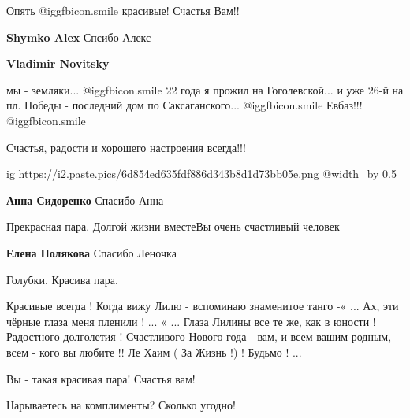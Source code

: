  
 
 
 
 

Опять  @igg{fbicon.smile}  красивые! Счастья Вам!!

\textbf{Shymko Alex} Спсибо Алекс

\textbf{Vladimir Novitsky} 

мы - земляки...  @igg{fbicon.smile}  22 года я прожил на Гоголевской... и уже 26-й на пл. Победы
- последний дом по Саксаганского...  @igg{fbicon.smile}  Евбаз!!!  @igg{fbicon.smile} 

Счастья, радости и хорошего настроения всегда!!!


\ifcmt
  ig https://i2.paste.pics/6d854ed635fdf886d343b8d1d73bb05e.png
  @width_by 0.5
\fi

\textbf{Анна Сидоренко} Спасибо Анна

Прекрасная пара. Долгой жизни вместеВы очень счастливый человек

\textbf{Елена Полякова} Спасибо Леночка

Голубки. Красива пара.


Красивые всегда ! Когда вижу Лилю - вспоминаю знаменитое танго -« ... Ах, эти
чёрные глаза меня пленили ! ... « ... Глаза Лилины все те же, как в юности !
Радостного долголетия ! Счастливого Нового года - вам, и всем вашим родным,
всем - кого вы любите !! Ле Хаим ( За Жизнь !) ! Будьмо ! ...

Вы - такая красивая пара! Счастья вам!

Нарываетесь на комплименты? Сколько угодно!
